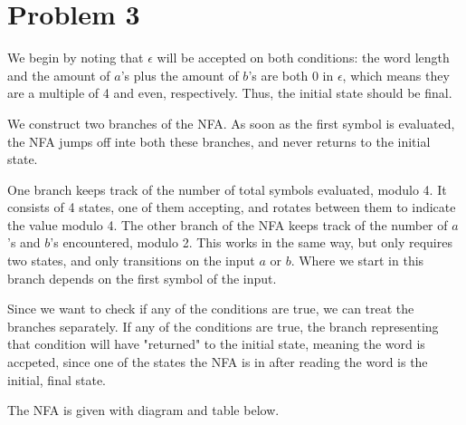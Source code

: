 \documentclass{article}
\begin{document}
\newpage
\section*{Problem 3}

We begin by noting that $\epsilon$ will be accepted on both conditions: the word length and the amount of $a$'s plus the amount of $b$'s are both 0 in $\epsilon$, which means they are a multiple of 4 and even, respectively. Thus, the initial state should be final.

We construct two branches of the NFA. As soon as the first symbol is evaluated, the NFA jumps off inte both these branches, and never returns to the initial state.

One branch keeps track of the number of total symbols evaluated, modulo 4. It consists of 4 states, one of them accepting, and rotates between them to indicate the value modulo 4. The other branch of the NFA keeps track of the number of $a$'s and $b$'s encountered, modulo 2. This works in the same way, but only requires two states, and only transitions on the input $a$ or $b$. Where we start in this branch depends on the first symbol of the input.

Since we want to check if any of the conditions are true, we can treat the branches separately. If any of the conditions are true, the branch representing that condition will have "returned" to the initial state, meaning the word is accpeted, since one of the states the NFA is in after reading the word is the initial, final state.

The NFA is given with diagram and table below.

        \begin{center}
        \end{center}
\end{document}
